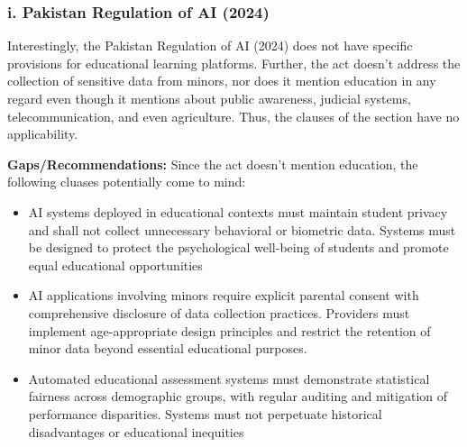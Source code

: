 \documentclass{article}
\theoremstyle{mytheoremstyle}
\theoremstyle{mytheoremstyle}
\theoremstyle{myproblemstyle}
\begin{document}
\subsubsection*{i. Pakistan Regulation of AI (2024)}
\noindent Interestingly, the Pakistan Regulation of AI (2024) does not have specific provisions for educational learning platforms. Further, the act doesn't address the collection of sensitive data from minors, nor does it mention education in any regard even though it mentions about public awareness, judicial systems, telecommunication, and even agriculture. Thus, the clauses of the section have no applicability. 

\textbf{Gaps/Recommendations:} Since the act doesn't mention education, the following cluases potentially come to mind:
\begin{itemize}
    \item AI systems deployed in educational contexts must maintain student privacy and shall not collect unnecessary behavioral or biometric data. Systems must be designed to protect the psychological well-being of students and promote equal educational opportunities
    \item AI applications involving minors require explicit parental consent with comprehensive disclosure of data collection practices. Providers must implement age-appropriate design principles and restrict the retention of minor data beyond essential educational purposes.
    \item Automated educational assessment systems must demonstrate statistical fairness across demographic groups, with regular auditing and mitigation of performance disparities. Systems must not perpetuate historical disadvantages or educational inequities
\end{itemize}
\end{document}

